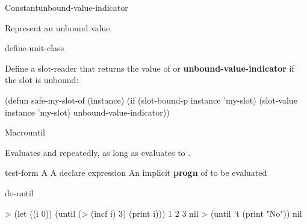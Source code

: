 \documentclass[10pt,twoside,english,pdftex]{article}
\begin{document}
\begin{functiondoc}{Constant}{unbound-value-indicator}{}%

\fnsyntax

\fnpurpose Represent an unbound value.

\fnpackage {}

\fnmodule {}

\begin{alsos}{define-unit-class}
\end{alsos}

\fnexample
Define a slot-reader  that returns the value of  or 
\textbf{unbound-value-indicator} if the slot is unbound: 
\begin{example}
(defun safe-my-slot-of (instance)
  (if (slot-bound-p instance 'my-slot)
      (slot-value instance 'my-slot)
      unbound-value-indicator))
\end{example}

\end{functiondoc}


\begin{functiondoc}{Macro}{until}{ 
    \superstar{}
    \superstar}
%
  
\fnsyntax

\fnpurpose Evaluates  and  repeatedly,
as long as  evaluates to \nil.

\fnpackage {}

\fnmodule {}

\fnargs
\begin{args}{test-form}
 A 
\arg[declaration] A declare expression
\arg[forms] An implicit \textbf{progn} of  to be evaluated
\end{args}

\begin{alsos}{do-until}
\also[do-until]
\also[while]
\end{alsos}

\fnexamples
\begin{example}
> (let ((i 0)) 
    (until (> (incf i) 3) 
       (print i)))
1 
2 
3 
nil
> (until 't (print "No"))
nil
\end{example}

\end{functiondoc}
\end{document}
